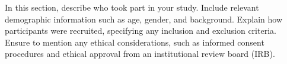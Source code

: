In this section, describe who took part in your study. Include relevant demographic information such as age, gender, and background. Explain how participants were recruited, specifying any inclusion and exclusion criteria. Ensure to mention any ethical considerations, such as informed consent procedures and ethical approval from an institutional review board (IRB).